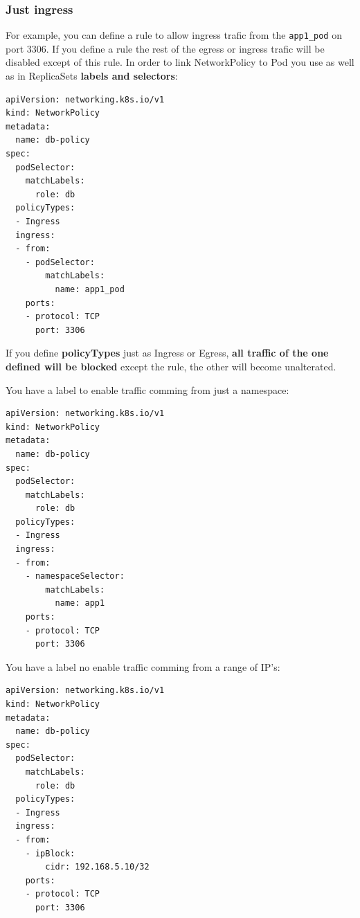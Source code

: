 \documentclass{article}
\newenvironment{blocktemplateII}[1]{%
    \tcolorbox[beamer,%
    noparskip,breakable,
    colframe=Green,%
    colbacklower=LimeGreen!75!LightGreen,%
    title=#1]}%
    {\endtcolorbox}
\newenvironment{codetemplate}[1][]{%
  \mybasecolorbox[#1]
  \itshape
}{%
  \endmybasecolorbox
}
\begin{document}
\subsubsection{Just ingress}
For example, you can define a rule to allow ingress trafic from the \verb|app1_pod| on port 3306. If you define a rule the rest of the egress or ingress trafic will be disabled except of this rule. In order to link NetworkPolicy to Pod you use as well as in ReplicaSets \textbf{labels and selectors}:
\begin{codetemplate}{}
\begin{verbatim}
apiVersion: networking.k8s.io/v1
kind: NetworkPolicy
metadata:
  name: db-policy
spec:
  podSelector:
    matchLabels:
      role: db
  policyTypes:
  - Ingress
  ingress:
  - from:
    - podSelector:
        matchLabels:
          name: app1_pod
    ports:
    - protocol: TCP
      port: 3306
\end{verbatim}
\end{codetemplate}

\begin{blocktemplateII}{NOTE}
If you define \textbf{policyTypes} just as Ingress or Egress, \textbf{all traffic of the one defined will be blocked} except the rule, the other will become unalterated.
\end{blocktemplateII}

You have a label to enable traffic comming from just a namespace:
\begin{codetemplate}{}
\begin{verbatim}
apiVersion: networking.k8s.io/v1
kind: NetworkPolicy
metadata:
  name: db-policy
spec:
  podSelector:
    matchLabels:
      role: db
  policyTypes:
  - Ingress
  ingress:
  - from:
    - namespaceSelector:
        matchLabels:
          name: app1
    ports:
    - protocol: TCP
      port: 3306
\end{verbatim}
\end{codetemplate}

You have a label no enable traffic comming from a range of IP's:
\begin{codetemplate}{}
\begin{verbatim}
apiVersion: networking.k8s.io/v1
kind: NetworkPolicy
metadata:
  name: db-policy
spec:
  podSelector:
    matchLabels:
      role: db
  policyTypes:
  - Ingress
  ingress:
  - from:
    - ipBlock:
        cidr: 192.168.5.10/32
    ports:
    - protocol: TCP
      port: 3306
\end{verbatim}
\end{codetemplate}
\end{document}
